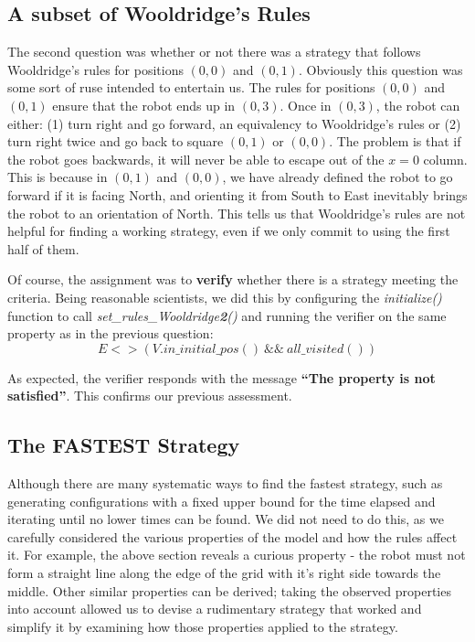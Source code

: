 \documentclass{article}
\begin{document}
\subsection{A subset of Wooldridge's Rules}

The second question was whether or not there was a strategy that follows Wooldridge's rules for positions $(0,0)$ and $(0,1)$.
Obviously this question was some sort of ruse intended to entertain us.
The rules for positions $(0,0)$ and $(0,1)$ ensure that the robot ends up in $(0,3)$.
Once in $(0,3)$, the robot can either: (1) turn right and go forward, an equivalency to Wooldridge's rules
or (2) turn right twice and go back to square $(0,1)$ or $(0,0)$.
The problem is that if the robot goes backwards, it will never be able to escape out of the $x=0$ column.
This is because in $(0,1)$ and $(0,0)$, we have already defined the robot to go forward if it is facing North, and orienting it from South to East inevitably brings the robot to an orientation of North.
This tells us that Wooldridge's rules are not helpful for finding a working strategy, even if we only commit to using the first half of them.

Of course, the assignment was to \textbf{verify} whether there is a strategy meeting the criteria.
Being reasonable scientists, we did this by configuring the \textit{initialize()} function to call \textit{set\_rules\_Wooldridge\textbf{2}()} and running the verifier on the same property as in the previous question:
\[ E<>(V.in\_initial\_pos() ~ \&\& ~ all\_visited()) \]

As expected, the verifier responds with the message \textbf{``The property is not satisfied''}.
This confirms our previous assessment.

\subsection{The FASTEST Strategy}

Although there are many systematic ways to find the fastest strategy, such as generating configurations with a fixed upper bound for the time elapsed and iterating until no lower times can be found.
We did not need to do this, as we carefully considered the various properties of the model and how the rules affect it.
For example, the above section reveals a curious property \-- the robot must not form a straight line along the edge of the grid with it's right side towards the middle.
Other similar properties can be derived; taking the observed properties into account allowed us to devise a rudimentary strategy that worked and simplify it by examining how those properties applied to the strategy. 
\end{document}
